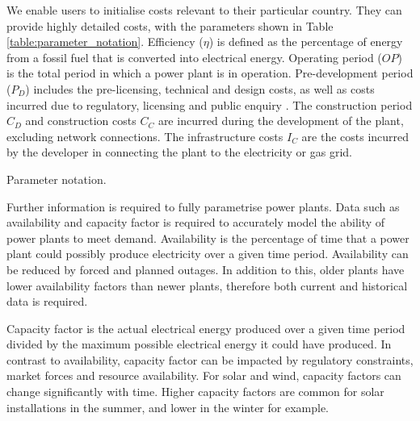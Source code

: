 We enable users to initialise costs relevant to their particular country. They can provide highly detailed costs, with the parameters shown in Table \ref{table:parameter_notation}. Efficiency ($\eta$) is defined as the percentage of energy from a fossil fuel that is converted into electrical energy. Operating period ($OP$) is the total period in which a power plant is in operation. Pre-development period ($P_D$) includes the pre-licensing, technical and design costs, as well as costs incurred due to regulatory, licensing and public enquiry \cite{Ltd2016}. The construction period $C_D$ and construction costs $C_C$ are incurred during the development of the plant, excluding network connections. The infrastructure costs $I_C$ are the costs incurred by the developer in connecting the plant to the electricity or gas grid. 



\begin{table}[h]
	\centering
	\caption{Parameter notation.}
	\label{table:parameter_notation}
\end{table}

Further information is required to fully parametrise power plants. Data such as availability and capacity factor is required to accurately model the ability of power plants to meet demand. Availability is the percentage of time that a power plant could possibly produce electricity over a given time period. Availability can be reduced by forced and planned outages. In addition to this, older plants have lower availability factors than newer plants, therefore both current and historical data is required. 

Capacity factor is the actual electrical energy produced over a given time period divided by the maximum possible electrical energy it could have produced. In contrast to availability, capacity factor can be impacted by regulatory constraints, market forces and resource availability. For solar and wind, capacity factors can change significantly with time. Higher capacity factors are common for solar installations in the summer, and lower in the winter for example. 






